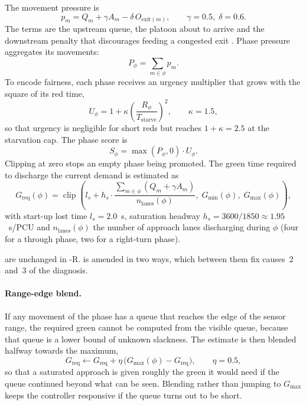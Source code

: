The movement pressure is
\begin{equation}
  p_m = Q_m + \gamma A_m - \delta\, O_{\text{exit}(m)}, \qquad \gamma = 0.5,\; \delta = 0.6.
  \label{eq:pressure}
\end{equation}
The terms are the upstream queue, the platoon about to arrive and the downstream penalty that discourages feeding a congested exit
\cite{gregoire2015capacity}. Phase pressure aggregates its movements:
\begin{equation}
  P_\phi = \sum_{m \in \phi} p_m .
  \label{eq:phase-pressure}
\end{equation}
To encode fairness, each phase receives an urgency multiplier that grows with the square of its red
time,
\begin{equation}
  U_\phi = 1 + \kappa \left( \frac{R_\phi}{T_{\text{starve}}} \right)^{2}, \qquad \kappa = 1.5,
  \label{eq:urgency}
\end{equation}
so that urgency is negligible for short reds but reaches $1+\kappa = 2.5$ at the starvation cap. The
phase score is
\begin{equation}
  S_\phi = \max(P_\phi, 0)\cdot U_\phi .
  \label{eq:score}
\end{equation}
Clipping at zero stops an empty phase being promoted. The green time required to discharge the current demand is estimated as
\begin{equation}
  G_{\text{req}}(\phi) = \operatorname{clip}\!\left( l_s + h_s \cdot
  \frac{\sum_{m \in \phi} (Q_m + \gamma A_m)}{n_{\text{lanes}}(\phi)},\; G_{\min}(\phi),\; G_{\max}(\phi) \right),
  \label{eq:greq}
\end{equation}
with start-up lost time $l_s = 2.0$~s, saturation headway $h_s = 3600/1850 \approx 1.95$~s/PCU and
$n_{\text{lanes}}(\phi)$ the number of approach lanes discharging during $\phi$ (four for a through
phase, two for a right-turn phase).

 are unchanged in \prism{}-R.  is
amended in two ways, which between them fix causes~2 and~3 of the diagnosis.

\paragraph{Range-edge blend.} If any movement of the phase has a queue that reaches the edge of the sensor
range, the required green cannot be computed from the visible queue, because that queue is a lower bound of
unknown slackness. The estimate is then blended halfway towards the maximum,
\begin{equation}
  G_{\text{req}} \leftarrow G_{\text{req}} + \eta\,\bigl(G_{\max}(\phi) - G_{\text{req}}\bigr),
  \qquad \eta = 0.5,
  \label{eq:impl-edgeblend}
\end{equation}
so that a saturated approach is given roughly the green it would need if the queue continued beyond what can
be seen. Blending rather than jumping to $G_{\max}$ keeps the controller responsive if the queue turns out to
be short.

